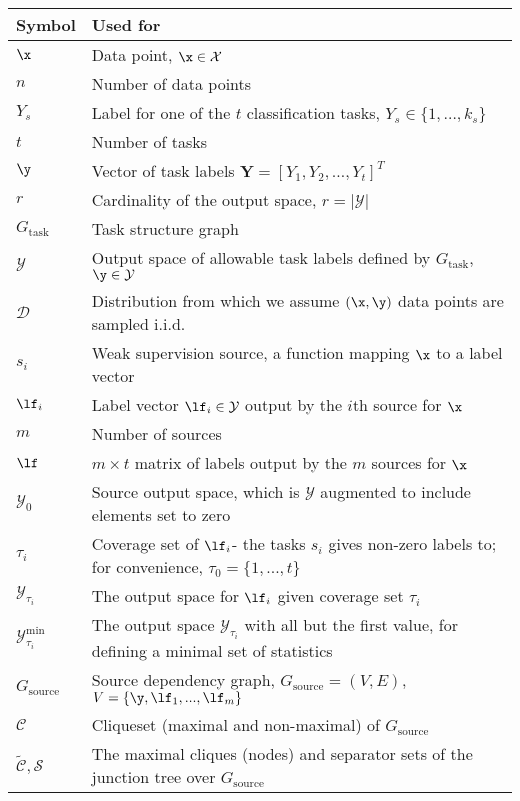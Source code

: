 \documentclass[letterpaper]{article}
\begin{document}
\begin{appendix}
\begin{table*}[h]
\centering
\begin{tabular}{l l}
\toprule
Symbol & Used for \\
\midrule
$\x$ & Data point, $\x \in \mathcal{X}$ \\
$n$ & Number of data points \\
$Y_s$ & Label for one of the $t$ classification tasks, $Y_s \in \{1, \ldots, k_s\}$ \\
$t$ & Number of tasks \\
$\y$ & Vector of task labels $\textbf{Y} = [Y_1, Y_2, \ldots, Y_t]^T$ \\
$r$ & Cardinality of the output space, $r = |\mathcal{Y}|$ \\
$G_{\text{task}}$ & Task structure graph \\
$\mathcal{Y}$ & Output space of allowable task labels defined by $G_{\text{task}}$, $\y \in \mathcal{Y}$ \\
$\mathcal{D}$ & Distribution from which we assume $(\x, \y)$ data points are sampled i.i.d. \\
$s_i$ & Weak supervision source, a function mapping $\x$ to a label vector\\
$\lf_i$ & Label vector $\lf_i \in \mathcal{Y}$ output by the $i$th source for $\x$ \\
$m$ & Number of sources \\
$\lf$ & $m \times t$ matrix of labels output by the $m$ sources for $\x$ \\
$\mathcal{Y}_0$ & Source output space, which is $\mathcal{Y}$ augmented to include elements set to zero \\
$\tau_i$ & Coverage set of $\lf_i$- the tasks $s_i$ gives non-zero labels to; for convenience, $\tau_0 = \{1,...,t\}$ \\
$\mathcal{Y}_{\tau_i}$ & The output space for $\lf_i$ given coverage set $\tau_i$ \\
$\mathcal{Y}_{\tau_i}^{\text{min}}$ & The output space $\mathcal{Y}_{\tau_i}$ with all but the first value, for defining a minimal set of statistics \\
$G_{\text{source}}$ & Source dependency graph, $G_{\text{source}} = (V,E)$, $V=\{\y,\lf_1,...,\lf_m\}$ \\
$\mathcal{C}$ & Cliqueset (maximal and non-maximal) of $G_{\text{source}}$ \\
$\tilde{\mathcal{C}}, \mathcal{S}$ & The maximal cliques (nodes) and separator sets of the junction tree over $G_{\text{source}}$ \\

\end{tabular}
\end{table*}
\end{appendix}
\end{document}
